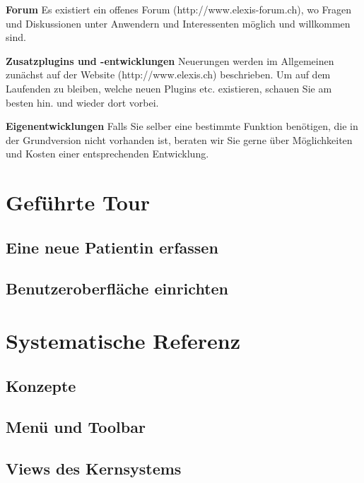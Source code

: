 \documentclass[paper=a4,BCOR8.25mm,twoside]{scrbook}
\begin{document}
\bigskip

\textbf{Forum}
Es existiert ein offenes Forum (http://www.elexis-forum.ch), wo Fragen und Diskussionen unter Anwendern und Interessenten möglich und willkommen sind.

\bigskip

\textbf{Zusatzplugins und -entwicklungen}
Neuerungen werden im Allgemeinen zunächst auf der Website (http://www.elexis.ch) beschrieben. Um auf dem Laufenden zu bleiben, welche neuen Plugins etc. existieren, schauen Sie am besten hin. und wieder dort vorbei.

\bigskip
{}
\textbf{Eigenentwicklungen}
Falls Sie selber eine bestimmte Funktion benötigen, die in der Grundversion nicht vorhanden ist, beraten wir Sie gerne über Möglichkeiten und Kosten einer entsprechenden Entwicklung.




\part{Geführte Tour}
\chapter{Eine neue Patientin erfassen}
\label{tour}
	
\chapter{Benutzeroberfläche einrichten}
	\label{customize}
	

\part{Systematische Referenz}
\chapter{Konzepte}
	
\chapter{Menü und Toolbar} 					
	
\chapter{Views des Kernsystems}
	
	
	
	
	
	
	
\end{document}
